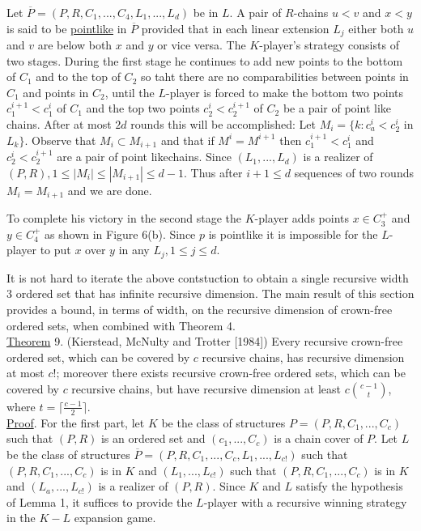 \documentclass[twoside]{article}
\begin{document}
Let $\overline{P} = (P,R,C_1,...,C_4,L_1,...,L_d)$ be in $L$. A pair of $R$-chains
$u<v$ and $x<y$ is said to be \underline{pointlike} in $\overline{P}$ 
provided that in each linear extension $L_j$ either both $u$ and $v$ are below
both $x$ and $y$ or vice versa. The $K$-player's strategy consists of two 
stages. During the first stage he continues to add new points to the bottom
of $C_1$ and to the top of $C_2$ so taht there are no comparabilities between points 
in $C_1$ and points in $C_2$, until the $L$-player is forced to make the bottom
two points $c_1^{i+1} < c_1^i$ of $C_1$ and the top two points $c_2^i < c_2^{i+1}$
of $C_2$ be a pair of point like chains. After at most $2d$ rounds this will be accomplished:
Let $M_i=\{k: c_a^i < c_2^i$ in $L_k\}$. Observe that $M_i \subset M_{i+1}$ and that if $M^i = M^{i+1}$ then
$c^{i+1}_1 < c^i_1$ and $c_2^i < c_2^{i+1}$ are a pair of point likechains. Since $(L_1,...,L_d)$
is a realizer of $(P,R), 1 \leq |M_i| \leq |M_{i+1}| \leq d-1$. Thus after
$i+1 \leq d$ sequences of two rounds $M_i = M_{i+1}$ and we are done. 

To complete his victory in the second stage the $K$-player adds points
$x \in C_3^+$ and $y \in C_4^+$ as shown in Figure 6(b). Since $p$ is pointlike
it is impossible for the $L$-player to put $x$ over $y$ in any $L_j, 1 \leq j\leq d$.

It is not hard to iterate the above contstuction to obtain a single recursive width 3
ordered set that has infinite recursive dimension. The main result of this section provides
a bound, in terms of width, on the recursive dimension of crown-free ordered sets, when combined with Theorem 4.\\
\newline
\underline{Theorem} 9. (Kierstead, McNulty and Trotter [1984]) Every recursive crown-free
ordered set, which can be covered by $c$ recursive chains, has recursive dimension
at most $c!$; moreover there exists recursive crown-free ordered sets, which can be covered
by $c$ recursive chains, but have recursive dimension at least $c {{c-1}\choose t}$, where
$t= \lceil \frac{c-1} {2} \rceil$.\\
\newline
%
%
\underline{Proof}. For the first part, let $K$ be the class of structures
$P = (P,R,C_1,...,C_c)$ such that $(P,R)$ is an ordered set and $(c_1,...,C_c)$
is a chain cover of $P$. Let $L$ be the class of structures
$\overline{P} =(P,R,C_1,...,C_c,L_1,...,L_{c!})$ such that $(P,R,C_1,...,C_c)$ is in
$K$ and $(L_1,...,L_{c!})$ such that $(P,R,C_1,...,C_c)$ is in $K$ and $(L_a,...,L_{c!})$
is a realizer of $(P,R)$. Since $K$ and $L$ satisfy the hypothesis of Lemma 1, it
suffices to provide the $L$-player with a recursive winning strategy in the $K-L$ 
expansion game.
\end{document}
